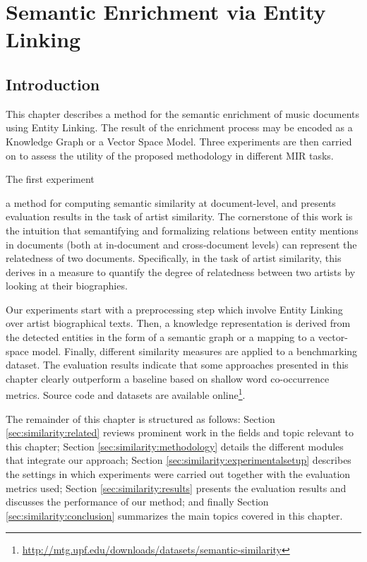 
\chapter{Semantic Enrichment via Entity Linking}
\label{sec:similarity:similarity}

\section{Introduction}\label{sec:similarity:introduction} %

This chapter describes a method for the semantic enrichment of music documents using Entity Linking. The result of the enrichment process may be encoded as a Knowledge Graph or a Vector Space Model. Three experiments are then carried on to assess the utility of the proposed methodology in different MIR tasks.

The first experiment  

a method for computing semantic similarity at document-level, and presents evaluation results in the task of artist similarity. The cornerstone of this work is the intuition that semantifying and formalizing relations between entity mentions in documents (both at in-document and cross-document levels) can represent the relatedness of two documents. Specifically, in the task of artist similarity, this derives in a measure to quantify the degree of relatedness between two artists by looking at their biographies.

Our experiments start with a preprocessing step which involve Entity Linking over artist biographical texts.
Then, a knowledge representation is derived from the detected entities in the form of a semantic graph or a mapping to a vector-space model.
Finally, different similarity measures are applied to a benchmarking dataset. The evaluation results indicate that some approaches presented in this chapter clearly outperform a baseline based on shallow word co-occurrence metrics.
Source code and datasets are available online\footnote{\url{http://mtg.upf.edu/downloads/datasets/semantic-similarity}}.

The remainder of this chapter is structured as follows: Section \ref{sec:similarity:related} reviews prominent work in the fields and topic relevant to this chapter; Section \ref{sec:similarity:methodology} details the different modules that integrate our approach; Section \ref{sec:similarity:experimentalsetup} describes the settings in which experiments were carried out together with the evaluation metrics used; Section \ref{sec:similarity:results} presents the evaluation results and discusses the performance of our method; and finally Section \ref{sec:similarity:conclusion} summarizes the main topics covered in this chapter.

